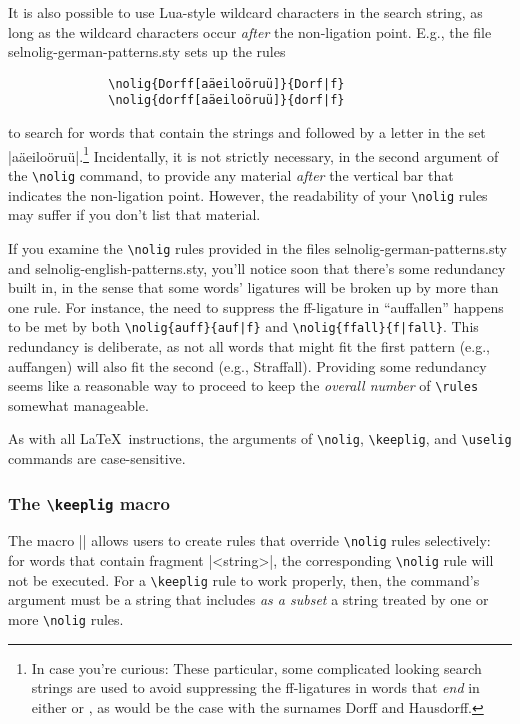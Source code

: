 \documentclass[11pt]{article}
\newcommand{\pkg}[1]{\textsf{#1}}
\newcommand{\opt}[1]{\uselig{\texttt{#1}}}
\newcommand{\cmmd}[1]{\texttt{\textbackslash #1}}
\begin{document}
It is also possible to use Lua-style wildcard characters in the search string, as long as the wildcard characters occur \emph{after} the non-ligation point. E.g., the file \pkg{selnolig-german-patterns.sty} sets up the rules 
\begin{Verbatim}
              \nolig{Dorff[aäeiloöruü]}{Dorf|f}
              \nolig{dorff[aäeiloöruü]}{dorf|f}
\end{Verbatim}
to search for words that contain the strings \opt{Dorff} and \opt{dorff} followed by a letter in the set |aäeiloöruü|.\footnote{In case you're curious: These particular, some complicated looking search strings are used to avoid suppressing the ff-ligatures in words that \emph{end} in either \opt{Dorff} or \opt{dorff}, as would be the case with the surnames Dorff and Hausdorff.} Incidentally, it is not strictly necessary, in the second argument of the \cmmd{nolig} command, to provide any material \emph{after} the vertical bar that indicates the non-ligation point. However, the readability of your \cmmd{nolig} rules may suffer if you don't list that material.

If you examine the \cmmd{nolig} rules provided in the files \pkg{selnolig-german-patterns.sty} and \pkg{selnolig-english-patterns.sty}, you'll notice soon that there's some redundancy built in, in the sense that some words' ligatures will be broken up by more than one rule. For instance, the need to suppress the ff-ligature in \enquote{auffallen} happens to be met by both \Verb+\nolig{auff}{auf|f}+ and \Verb+\nolig{ffall}{f|fall}+. This redundancy is deliberate, as not all words that might fit the first pattern (e.g., auffangen) will also fit the second (e.g., Straffall). Providing some redundancy seems like a reasonable way to proceed to keep the \emph{overall number} of \cmmd{rules} somewhat manageable.

As with all \LaTeX\ instructions, the arguments of  \cmmd{nolig}, \cmmd{keeplig}, and \cmmd{uselig} commands are case-sensitive. 

\subsubsection{The \cmmd{keeplig} macro} 
\label{sec:keeplig}


The macro || allows users to create rules that override \cmmd{nolig} rules selectively: for words that contain fragment |<string>|, the corresponding \cmmd{nolig} rule will not be executed. For a \cmmd{keeplig} rule to work properly, then, the command's argument must be a string that includes \emph{as a subset} a string treated by one or more \cmmd{nolig} rules.
\end{document}
